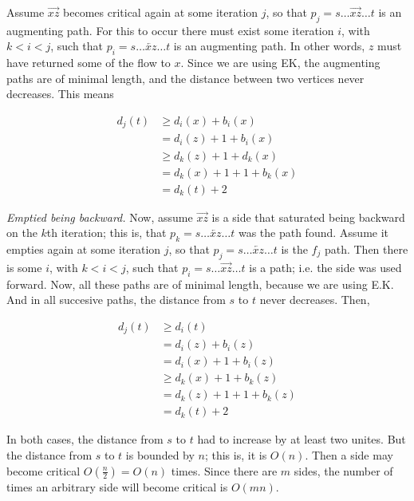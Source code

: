 Assume $\overrightarrow{xz}$ becomes critical again at some iteration $j$, so
that $p_j = s \ldots \overrightarrow{xz} \ldots t$ is an augmenting path. For
this to occur there must exist some iteration $i$, with $k < i < j$, such that
$p_i = s \ldots \overleftarrow{xz} \ldots t$ is an augmenting path. In other
words, $z$ must have returned some of the flow to $x$. Since we are using EK,
the augmenting paths are of minimal length, and the distance between two
vertices never decreases. This means 

\begin{align*}
    d_j(t) &\geq d_i(x) + b_i(x)  \\ 
           &=d_i(z) + 1 + b_i(x) \\ 
           &\geq d_k(z) + 1 + d_k(x) \\ 
           &=d_k(x) + 1 + 1 + b_k(x) \\ 
           &=d_k(t) + 2
\end{align*}

\textit{Emptied being backward.} Now, assume $\overrightarrow{xz}$ is a side
that saturated being backward on the $k$th iteration; this is, that $p_k = s
\ldots \overleftarrow{xz} \ldots t$ was the path found. Assume it empties again
at some iteration $j$, so that $p_j = s \ldots \overleftarrow{xz} \ldots t$ is
the $f_j$ path. Then there is some $i$, with $k < i < j$, such that $p_i = s
\ldots \overrightarrow{xz} \ldots t$ is a path; i.e. the side was used forward.
Now, all these paths are of minimal length, because we are using 
E.K. And in all succesive paths, the distance from $s$ to $t$ never 
decreases. Then,

\begin{align*}
    d_j(t) &\geq d_i(t) \\ 
           &= d_i(z) + b_i(z) \\ 
           &= d_i(x) + 1 + b_i(z) \\ 
           &\geq d_k(x) +1 + b_k(z) \\ 
           &=d_k(z) + 1 + 1 + b_k(z) \\ 
           &= d_k(t) + 2
\end{align*}

In both cases, the distance from $s$ to $t$ had to increase by at least 
two unites. But the distance from $s$ to $t$ is bounded by $n$; this is, 
it is $O(n)$. Then a side may become critical $O(\frac{n}{2}) = O(n)$ times.
Since there are $m$ sides, the number of times an arbitrary side will become 
critical is $O(mn)$.

